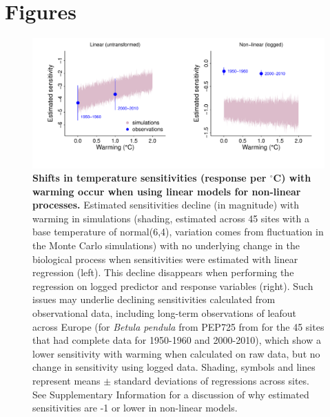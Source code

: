 \documentclass[11pt,letter]{article}
\begin{document}
\newpage
\section* {Figures}

\begin{figure}[h!]
\centering
\noindent \includegraphics[width=1.05\textwidth]{..//analyses/figures/basicsimsandpepalt1.pdf} %
\caption{\textbf{Shifts in temperature sensitivities (response per $^{\circ}$C)  with warming occur when using linear models for non-linear processes.} Estimated sensitivities decline (in magnitude) with warming in simulations (shading, estimated across 45 sites with a base temperature of normal(6,4), variation comes from fluctuation in the Monte Carlo simulations) with no underlying change in the biological process when sensitivities were estimated with linear regression (left). This decline disappears when performing the regression on logged predictor and response variables (right). Such issues may underlie declining sensitivities calculated from observational data, including long-term observations of leafout across Europe (for \emph{Betula pendula} from PEP725 from for the 45 sites that had complete data for 1950-1960 and 2000-2010), which show a lower sensitivity with warming when calculated on raw data, but no change in sensitivity using logged data. Shading, symbols and lines represent means $\pm$ standard deviations of regressions across sites. See Supplementary Information for a discussion of why estimated sensitivities are -1 or lower in non-linear models.} %
\label{fig:basicsimswpep} %
\end{figure}
\end{document}
